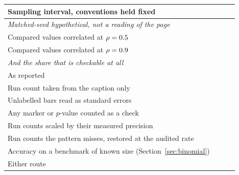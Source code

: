 \documentclass{article}
\begin{document}
\begin{table}[t]
\begin{tabular}{lrrr}
\midrule
Sampling interval, conventions held fixed & \nSpanN{} & \nCiFail{} & \nCiFailHolm{} \\
\midrule
\multicolumn{4}{l}{\emph{Matched-seed hypothetical, not a reading of the page}} \\
Compared values correlated at $\rho = 0.5{}$ & \nSpanN{} & \nFailRhoHalf{} & \nHolmRhoHalf{} \\
Compared values correlated at $\rho = 0.9{}$ & \nSpanN{} & \nFailRhoNine{} & \nHolmRhoNine{} \\
\midrule
\multicolumn{4}{l}{\emph{And the share that is checkable at all}} \\
As reported & \nComparisonsTwentyFive{} & \nPctTestable{} & \\
Run count taken from the caption only & \nComparisonsTwentyFive{} & \nStrictTestable{} & \\
Unlabelled bars read as standard errors & \nComparisonsTwentyFive{} & \nTestableAsSem{} & \\
Any marker or $p$-value counted as a check & \nComparisonsTwentyFive{} & \nTestableOrAnyMarker{} & \\
Run counts scaled by their measured precision & \nComparisonsTwentyFive{} & \nTestableScaledByPrecision{} & \\
Run counts the pattern misses, restored at the audited rate & \nComparisonsTwentyFive{} & \nTestableWithMissedCounts{} & \\
Accuracy on a benchmark of known size (Section~\ref{sec:binomial}) & \nComparisonsTwentyFive{} & \nCheckableItemRoute{} & \\
Either route & \nComparisonsTwentyFive{} & \nCheckableUnion{} & \\
\bottomrule
\end{tabular}
\end{table}
\end{document}
